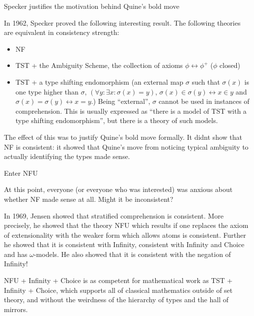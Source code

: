 \documentclass{slides}
\begin{document}
\begin{slide}

Specker justifies the motivation behind Quine's bold move

In 1962, Specker proved the following interesting result.  The following theories are equivalent in consistency strength:
{\small
\begin{itemize}

\item NF

\item TST + the Ambiguity Scheme, the collection of axioms $\phi \leftrightarrow \phi^+$ ($\phi$ closed)

\item  TST + a type shifting endomorphism (an external map $\sigma$ such that $\sigma(x)$ is one type higher than $\sigma$, $(\forall y:\exists x:\sigma(x)=y)$, $\sigma(x) \in \sigma(y) \leftrightarrow x \in y$ and $\sigma(x) = \sigma(y) \leftrightarrow x=y$.)  Being ``external'', $\sigma$ cannot be used in instances of comprehension.  This is usually expressed as ``there is a model of TST with a type shifting endomorphism'', but there is a theory of such models.

\end{itemize}}

The effect of this was to justify Quine's bold move formally.  It didnt show that NF is consistent:  it showed that Quine's move from noticing typical ambiguity to actually identifying the types made sense.


\end{slide}

\begin{slide}

Enter NFU

At this point, everyone (or everyone who was interested) was anxious about whether NF made sense at all.  Might it be inconsistent?

In 1969, Jensen showed that stratified comprehension is consistent.  More precisely, he showed that the theory NFU which results if one replaces the axiom of extensionality with the weaker form which allows atoms is consistent.  Further he showed that it is consistent with Infinity, consistent with Infinity and Choice and has $\omega$-models.  He also showed that it is consistent with the negation of Infinity!

NFU + Infinity + Choice is as competent for mathematical work as TST + Infinity + Choice, which supports all of classical mathematics outside of set theory, and without the weirdness of the hierarchy of types and the hall of mirrors.  

\end{slide}
\end{document}
